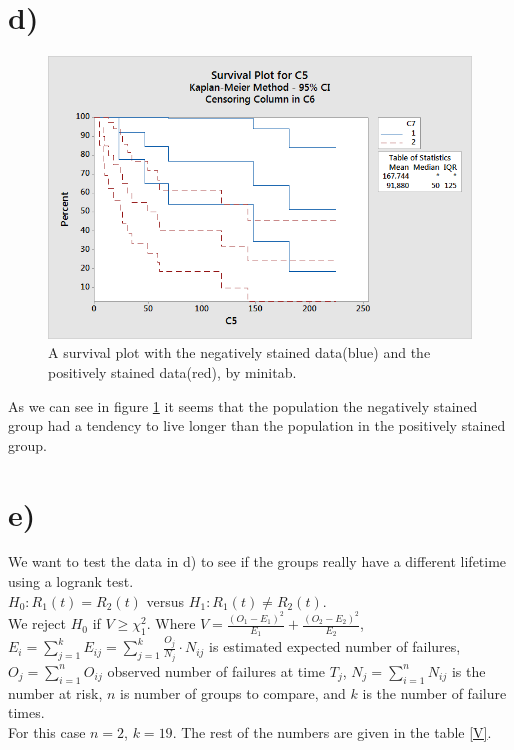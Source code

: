 \documentclass[10pt, a4paper]{article}
\begin{document}
\section*{d)}
     
\begin{center}
\begin{figure}[h!]
\centering
\includegraphics[scale=0.75]{same.png}
\caption{A survival plot with the negatively stained data(blue) and the positively stained data(red), by minitab.}
\label{same}
\end{figure}
\end{center}
As we can see in figure \ref{same} it seems that the population the negatively stained group had a tendency to live longer than the population in the positively stained group.

\section*{e)}
We want to test the data in d) to see if the groups really have a different lifetime using a logrank test. \\
$H_0 : R_1(t)=R_2(t) $ versus $ H_1 : R_1(t) \neq R_2(t) $.\\ We reject $H_0$ if $V \geq \chi^2_1 $. Where $V = \frac{(O_1-E_1)^2}{E_1}+\frac{(O_2-E_2)^2}{E_2} $, $E_i = \sum_{j=1}^k E_{i j} = \sum_{j=1}^k \frac{O_j}{N_j} \cdot N_{i j}$ is estimated expected number of failures, $ O_j = \sum_{i=1}^n O_{i j}$ observed number of failures at time $T_j$, $N_j = \sum_{i=1}^n N_{i j}$ is the number at risk, $n$ is number of groups to compare, and $k$ is the number of failure times.\\
For this case $n =2$, $k = 19$. The rest of the numbers are given in the table \ref{V}. 
\end{document}
